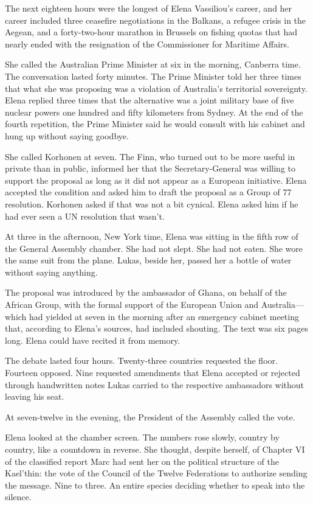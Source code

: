 \documentclass[11pt,a5paper,twoside]{book}
\begin{document}
The next eighteen hours were the longest of Elena Vassiliou's career, and her career included three ceasefire negotiations in the Balkans, a refugee crisis in the Aegean, and a forty-two-hour marathon in Brussels on fishing quotas that had nearly ended with the resignation of the Commissioner for Maritime Affairs.

She called the Australian Prime Minister at six in the morning, Canberra time. The conversation lasted forty minutes. The Prime Minister told her three times that what she was proposing was a violation of Australia's territorial sovereignty. Elena replied three times that the alternative was a joint military base of five nuclear powers one hundred and fifty kilometers from Sydney. At the end of the fourth repetition, the Prime Minister said he would consult with his cabinet and hung up without saying goodbye.

She called Korhonen at seven. The Finn, who turned out to be more useful in private than in public, informed her that the Secretary-General was willing to support the proposal as long as it did not appear as a European initiative. Elena accepted the condition and asked him to draft the proposal as a Group of 77 resolution. Korhonen asked if that was not a bit cynical. Elena asked him if he had ever seen a UN resolution that wasn't.

At three in the afternoon, New York time, Elena was sitting in the fifth row of the General Assembly chamber. She had not slept. She had not eaten. She wore the same suit from the plane. Lukas, beside her, passed her a bottle of water without saying anything.

The proposal was introduced by the ambassador of Ghana, on behalf of the African Group, with the formal support of the European Union and Australia—which had yielded at seven in the morning after an emergency cabinet meeting that, according to Elena's sources, had included shouting. The text was six pages long. Elena could have recited it from memory.

The debate lasted four hours. Twenty-three countries requested the floor. Fourteen opposed. Nine requested amendments that Elena accepted or rejected through handwritten notes Lukas carried to the respective ambassadors without leaving his seat.

At seven-twelve in the evening, the President of the Assembly called the vote.

Elena looked at the chamber screen. The numbers rose slowly, country by country, like a countdown in reverse. She thought, despite herself, of Chapter VI of the classified report Marc had sent her on the political structure of the Kael'thin: the vote of the Council of the Twelve Federations to authorize sending the message. Nine to three. An entire species deciding whether to speak into the silence.
\end{document}
